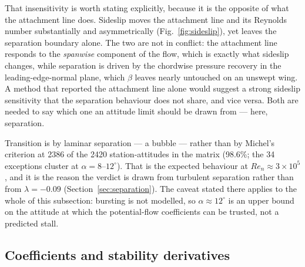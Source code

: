 \documentclass[submit]{aiaa-tc}%
\begin{document}
That insensitivity is worth stating explicitly, because it is the
opposite of what the attachment line does. Sideslip moves the attachment
line and its Reynolds number substantially and asymmetrically
(Fig.~\ref{fig:sideslip}), yet leaves the separation boundary alone. The
two are not in conflict: the attachment line responds to the
\emph{spanwise} component of the flow, which is exactly what sideslip
changes, while separation is driven by the chordwise pressure recovery in
the leading-edge-normal plane, which $\beta$ leaves nearly untouched on an
unswept wing. A method that reported the attachment line alone would
suggest a strong sideslip sensitivity that the separation behaviour does
not share, and vice versa. Both are needed to say which one an attitude
limit should be drawn from --- here, separation.

Transition is by laminar separation --- a bubble --- rather than by
Michel's criterion at 2386 of the 2420 station-attitudes in the matrix
(98.6\%; the 34 exceptions cluster at $\alpha = 8$--$12^\circ$). That is
the expected behaviour at $Re_n \approx 3\times10^5$, and it is the
reason the verdict is drawn from turbulent separation rather than from
$\lambda = -0.09$ (Section~\ref{sec:separation}). The caveat stated
there applies to the whole of this subsection: bursting is not modelled,
so $\alpha \approx 12^\circ$ is an upper bound on the attitude at which
the potential-flow coefficients can be trusted, not a predicted stall.

\subsection{Coefficients and stability derivatives}
\label{sec:coefficients}

\begin{table}[tb]
  \centering
  \caption{Force and moment coefficients over the attached portion of the
    attitude matrix. Rows at $\alpha \geq 12^\circ$ are omitted: the
    separation march of Section~\ref{sec:separation-results} places
    separation forward of $x/c_n = 0.90$ there, and a potential-flow
    coefficient past that point is an extrapolation rather than a
    prediction. $C_{D_i}$ comes from a near-field integration and carries a
    spurious body contribution --- it is negative at zero lift and is
    discussed, rather than relied on, in the text. The aerodynamics
    \emph{beyond} this table's edge --- the post-separation coefficients
    toward the flat-plate limit --- is the subject of Part~II.}
  \label{tab:coefficients}
  
\end{table}
\end{document}
